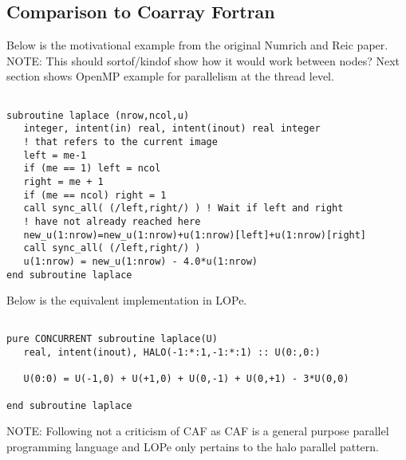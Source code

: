 
\subsection{Comparison to Coarray Fortran}

Below is the motivational example from the original Numrich and Reic paper.
{NOTE: This should sortof/kindof show how it would work between nodes?  Next
section shows OpenMP example for parallelism at the thread level.}

{\small
\begin{verbatim}

subroutine laplace (nrow,ncol,u)
   integer, intent(in) real, intent(inout) real integer
   ! that refers to the current image
   left = me-1
   if (me == 1) left = ncol
   right = me + 1
   if (me == ncol) right = 1
   call sync_all( (/left,right/) ) ! Wait if left and right
   ! have not already reached here
   new_u(1:nrow)=new_u(1:nrow)+u(1:nrow)[left]+u(1:nrow)[right]
   call sync_all( (/left,right/) )
   u(1:nrow) = new_u(1:nrow) - 4.0*u(1:nrow)
end subroutine laplace

\end{verbatim}
}


Below is the equivalent implementation in LOPe.


{\small
\begin{verbatim}

pure CONCURRENT subroutine laplace(U)
   real, intent(inout), HALO(-1:*:1,-1:*:1) :: U(0:,0:)

   U(0:0) = U(-1,0) + U(+1,0) + U(0,-1) + U(0,+1) - 3*U(0,0)

end subroutine laplace

\end{verbatim}
}

NOTE: Following not a criticism of CAF as CAF is a general purpose parallel
programming language and LOPe only pertains to the halo parallel pattern.

